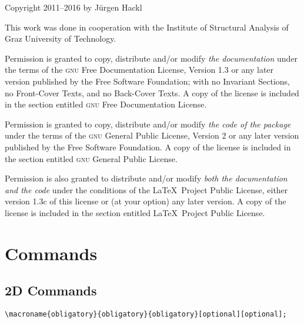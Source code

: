 \documentclass[%
  a4paper,
  BCOR20mm,
  pointlessnumbers,
  twoside,
  halfparskip,
  openright,
]{scrreprt}
\begin{document}
  Copyright 2011--2016 by J\"urgen Hackl

\medskip
This work was done in cooperation with the Institute of Structural Analysis of Graz University of Technology.

  \medskip
  Permission is granted to copy, distribute and/or modify \emph{the documentation} under the terms of the \textsc{gnu} Free Documentation License, Version 1.3 or any later version published by the Free Software Foundation; with no Invariant Sections, no Front-Cover Texts, and no Back-Cover Texts. A copy of the license is included in the section entitled \textsc{gnu} Free Documentation License.

  \medskip
  Permission is granted to copy, distribute and/or modify \emph{the code of the package} under the terms of the \textsc{gnu} General Public License, Version 2 or any later version published by the Free Software Foundation. A copy of the license is included in the section entitled \textsc{gnu} General Public License.

  \medskip
  Permission is also granted to distribute and/or modify \emph{both the documentation and the code} under the conditions of the \LaTeX\ Project Public License, either version 1.3c of this license or (at your option) any later version. A copy of the license is included in the section entitled \LaTeX\ Project Public License.


\tableofcontents
\cleardoubleplainpage

\setcounter{page}{1}




\chapter{Commands}
\label{sec:Befehlsubersicht}

\section{2D Commands}
\label{sec:2dcom}

\begin{lstlisting}[emph={macroname},backgroundcolor=\color{red!10}]
		\macroname{obligatory}{obligatory}{obligatory}[optional][optional];
\end{lstlisting}\vspace{-7mm}
\end{document}
